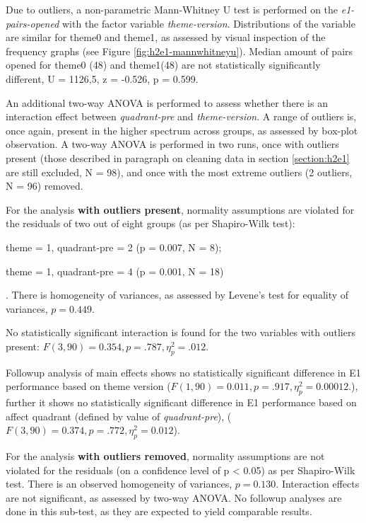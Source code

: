 		Due to outliers, a non-parametric Mann-Whitney U test is performed on the \textit{e1-pairs-opened} with the factor variable \textit{theme-version}. Distributions of the variable are similar for theme0 and theme1, as assessed by visual inspection of the frequency graphs (see Figure \ref{fig:h2e1-mannwhitneyu}). Median amount of pairs opened for theme0 (48) and theme1(48) are not statistically significantly different, U = 1126,5, z = -0.526, p = 0.599.
		
		An additional two-way ANOVA is performed to assess whether there is an interaction effect between \textit{quadrant-pre} and \textit{theme-version}. A range of outliers is, once again, present in the higher spectrum across groups, as assessed by box-plot observation. A two-way ANOVA is performed in two runs, once with outliers present (those described in paragraph on cleaning data in section \ref{section:h2e1} are still excluded, N = 98), and once with the most extreme outliers (2 outliers, N = 96) removed.
		
		For the analysis \textbf{with outliers present}, normality assumptions are violated for the residuals of two out of eight groups (as per Shapiro-Wilk test): 
		\begin{itemize*}
			\item theme = 1, quadrant-pre = 2 (p = 0.007, N = 8);
			\item theme = 1, quadrant-pre = 4 (p = 0.001, N = 18)
		\end{itemize*}. 
		There is homogeneity of variances, as assessed by Levene's test for equality of variances, $ p = 0.449 $.
		
		No statistically significant interaction is found for the two variables with outliers present: 
		$ F(3, 90) = 0.354, p = .787, \eta_{p}^{2} = .012 $.
		
		Followup analysis of main effects shows no statistically significant difference in E1 performance based on theme version ($ F(1, 90) = 0.011, p = .917, \eta_{p}^{2} = 0.00012. $), further it shows no statistically significant difference in E1 performance based on affect quadrant (defined by value of \textit{quadrant-pre}), ($ F(3, 90) = 0.374, p = .772, \eta_{p}^{2} = 0.012 $).
		
		For the analysis \textbf{with outliers removed}, normality assumptions are not violated for the residuals (on a confidence level of p < 0.05) as per Shapiro-Wilk test. There is an observed homogeneity of variances, $ p = 0.130 $. Interaction effects are not significant, as assessed by two-way ANOVA. No followup analyses are done in this sub-test, as they are expected to yield comparable results.

